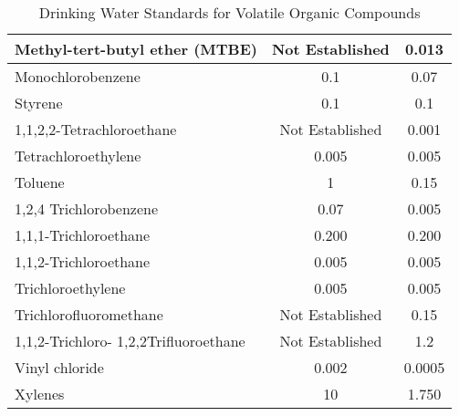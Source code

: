 \documentclass{article}
\begin{document}
\begin{table}[ht]
\begin{center}
\begin{tabular}{|l|c|c|}
Methyl-tert-butyl   ether   (MTBE)                                         & Not   Established & 0.013 \\ \hline
Monochlorobenzene                                                          & 0.1 & 0.07\\ \hline
Styrene                                                                    & 0.1  & 0.1  \\ \hline
1,1,2,2-Tetrachloroethane & Not   Established & 0.001\\ \hline
Tetrachloroethylene                                                        & 0.005   & 0.005  \\ \hline
Toluene                                                                    & 1 & 0.15 \\ \hline
1,2,4   Trichlorobenzene                                                   & 0.07   & 0.005  \\ \hline
1,1,1-Trichloroethane                                                      & 0.200 & 0.200\\ \hline
1,1,2-Trichloroethane                                                      & 0.005  & 0.005 \\ \hline
Trichloroethylene                                                          & 0.005 & 0.005\\ \hline
Trichlorofluoromethane                                                     & Not   Established & 0.15 \\ \hline
1,1,2-Trichloro-   1,2,2Trifluoroethane                                    & Not   Established & 1.2   \\ \hline
Vinyl   chloride                                                           & 0.002              & 0.0005 \\ \hline
Xylenes                                                                    & 10                & 1.750 \\ \hline
\end{tabular}
\caption{Drinking Water Standards for Volatile Organic Compounds}
\end{center}
\end{table}
\end{document}
